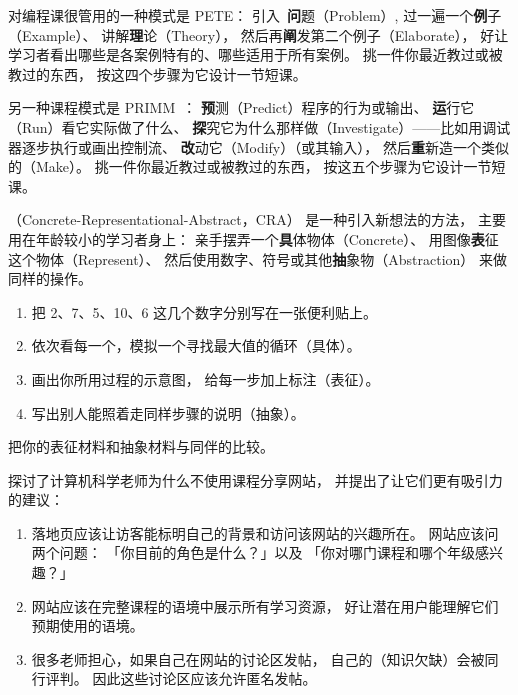 
对编程课很管用的一种模式是 PETE：
引入\ \textbf{问}题（Problem）,
过一遍一个\textbf{例}子（Example）、
讲解\textbf{理}论（Theory），
然后再\textbf{阐}发第二个例子（Elaborate），
好让学习者看出哪些是各案例特有的、哪些适用于所有案例。
挑一件你最近教过或被教过的东西，
按这四个步骤为它设计一节短课。


另一种课程模式是 PRIMM~\cite{Sent2019}：
\textbf{预}测（Predict）程序的行为或输出、
\textbf{运}行它（Run）看它实际做了什么、
\textbf{探}究它为什么那样做（Investigate）——比如用调试器逐步执行或画出控制流、
\textbf{改}动它（Modify）（或其输入），
然后\textbf{重}新造一个类似的（Make）。
挑一件你最近教过或被教过的东西，
按这五个步骤为它设计一节短课。


（Concrete-Representational-Abstract，CRA）
是一种引入新想法的方法，
主要用在年龄较小的学习者身上：
亲手摆弄一个\textbf{具}体物体（Concrete）、
用图像\textbf{表}征这个物体（Represent）、
然后使用数字、符号或其他\textbf{抽}象物（Abstraction）
来做同样的操作。

\begin{enumerate}

\item
  把 2、7、5、10、6 这几个数字分别写在一张便利贴上。

\item
  依次看每一个，模拟一个寻找最大值的循环（具体）。

\item
  画出你所用过程的示意图，
  给每一步加上标注（表征）。

\item
  写出别人能照着走同样步骤的说明（抽象）。
\end{enumerate}

把你的表征材料和抽象材料与同伴的比较。


\cite{Leak2017}探讨了计算机科学老师为什么不使用课程分享网站，
并提出了让它们更有吸引力的建议：

\begin{enumerate}

\item
  落地页应该让访客能标明自己的背景和访问该网站的兴趣所在。
  网站应该问两个问题：
  「你目前的角色是什么？」以及
  「你对哪门课程和哪个年级感兴趣？」

\item
  网站应该在完整课程的语境中展示所有学习资源，
  好让潜在用户能理解它们预期使用的语境。

\item
  很多老师担心，如果自己在网站的讨论区发帖，
  自己的（知识欠缺）会被同行评判。
  因此这些讨论区应该允许匿名发帖。

\end{enumerate}

